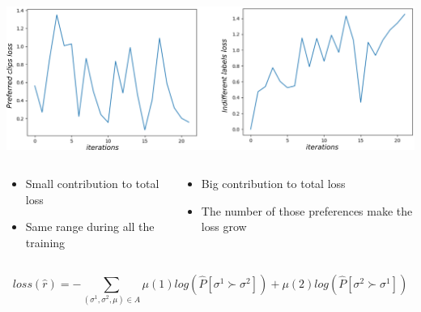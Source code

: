 \begin{frame}{}
\centering
\includegraphics[width=1\linewidth]{images/bothlosses.png}

\begin{adjustwidth}{-2em}{-2em}
    \begin{columns}
        \begin{column}{0.5\textwidth}
        \small{        
            \begin{itemize}
                \item Small contribution to total loss
                \item Same range during all the training
            \end{itemize}
        }
            
        \end{column}
        \begin{column}{0.5\textwidth}
        \small{
            \begin{itemize}
                \item Big contribution to total loss
                \item The number of those preferences make the loss grow
            \end{itemize}
        }
        
        \end{column}
        
    \end{columns}
\end{adjustwidth}

\begin{equation*}
loss(\hat{r}) = - \sum_{(\sigma^1,\sigma^2,\mu)\in A} \mu(1)log(\hat{P}[\sigma^1 \succ \sigma^2]) + \mu(2)log(\hat{P}[\sigma^2 \succ \sigma^1])
\end{equation*}

\end{frame}


